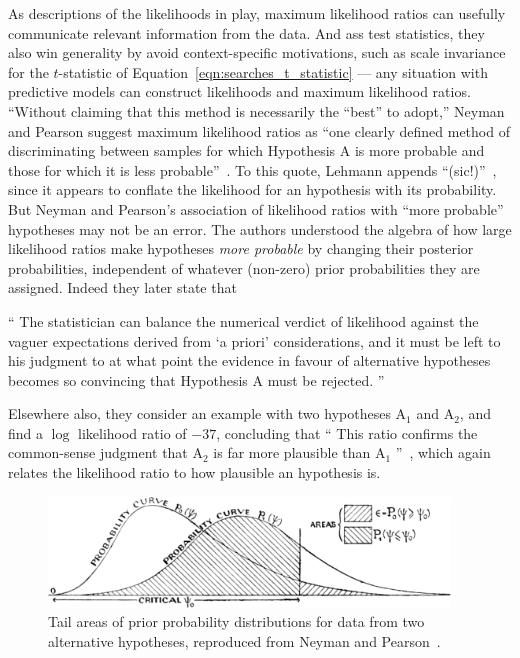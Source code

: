 As descriptions of the likelihoods in play, maximum likelihood ratios can
usefully communicate relevant information from the data.
And ass test statistics, they also win generality by avoid context-specific
motivations, such as scale invariance for the $t$-statistic of
Equation~\ref{eqn:searches_t_statistic} --- any situation with predictive
models can construct likelihoods and maximum likelihood ratios.
``Without claiming that this method is necessarily the ``best'' to adopt,''
Neyman and Pearson suggest maximum likelihood ratios as
``one clearly defined method of discriminating between samples for which
Hypothesis A is more probable and those for which it is less probable''~\cite{
neymanpearson1933lemma}.
To this quote, Lehmann appends ``(sic!)''~\cite{lehmann2011fisher}, since it
appears to conflate the likelihood for an hypothesis with its probability.
But Neyman and Pearson's association of likelihood ratios with
``more probable'' hypotheses may not be an error.
The authors understood the algebra of how large likelihood ratios make
hypotheses \emph{more probable} by changing their posterior probabilities,
independent of whatever (non-zero) prior probabilities they are assigned.
Indeed they later state that
\begin{displayquote}
``%
The statistician can balance the numerical verdict of likelihood against the
vaguer expectations derived from `a priori' considerations, and it must be left
to his judgment to at what point the evidence in favour of alternative
hypotheses becomes so convincing that Hypothesis A must be rejected.%
''~\cite{neymanpearson1933lemma}
\end{displayquote}
Elsewhere also, they consider an example with two hypotheses $\mathrm{A}_1$
and $\mathrm{A}_2$, and find a $\log$ likelihood ratio of
$-37$, concluding that
``%
This ratio confirms the common-sense judgment that $\mathrm{A}_2$ is far more
plausible than $\mathrm{A}_1$%
''~\cite{neymanpearson1928max},
which again relates the likelihood ratio to how plausible an hypothesis is.

\begin{figure}[tp]
\centering
\includegraphics[width=0.95\textwidth]{figures/searches_np_curves_crop.png}
\caption[
Tail areas of prior probability distributions for data from two alternative
hypotheses, reproduced from Neyman and Pearson
]{%
Tail areas of prior probability distributions for data from two alternative
hypotheses, reproduced from Neyman and Pearson~\cite{neymanpearson1933lemma}.
}
\label{fig:searches_np_tails}
\end{figure}


